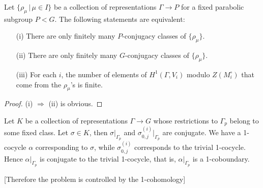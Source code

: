 \begin{lemma}\label{kToHOne} Let $\{\rho_\mu\, |\, \mu \in I\}$ be a collection of representations $\Gamma\rightarrow P$ for a fixed parabolic subgroup $P<G$. The following statements are equivalent:
	\begin{itemize}
		\item[(i)] There are only finitely many $P$-conjugacy classes of $\{\rho_\mu\}$.
		\item[(ii)] There are only finitely many $G$-conjugacy classes of $\{\rho_\mu\}$.
		\item[(iii)] For each $i$, the number of elements of $H^1(\Gamma, V_i)$ modulo $Z(M_i^\circ)$ that come from the $\rho_\mu$'s is finite.
	\end{itemize}
\end{lemma}
\begin{proof}
	(i) $\Rightarrow$ (ii) is obvious. 
\end{proof}

Let $K$ be a collection of representations $\Gamma \rightarrow G$ whose restrictions to $\Gamma_p$ belong to some fixed class. Let $\sigma\in K$, then $\sigma|_{\Gamma_p}$ and $\sigma_{0,j}^{(i)}|_{\Gamma_p}$ are conjugate. We have a 1-cocycle $\alpha$ corresponding to $\sigma$, while $\sigma_{0,j}^{(i)}$ corresponds to the trivial 1-cocycle. Hence $\alpha|_{\Gamma_p}$ is conjugate to the trivial 1-cocycle, that is, $\alpha|_{\Gamma_p}$ is a 1-coboundary. 

% 
% 
% 
% 

[Therefore the problem is controlled by the 1-cohomology]


